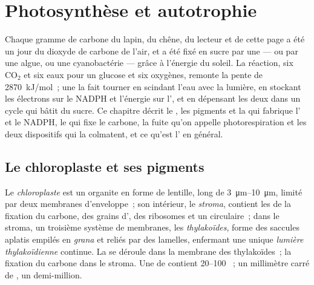 \chapter{Photosynthèse et autotrophie}\label{ch:b1:photosynthesis}

Chaque gramme de carbone du lapin, du chêne, du lecteur et de cette page
a été un jour du dioxyde de carbone de l'air, et a été fixé en sucre par
une  --- ou par une algue, ou une cyanobactérie --- grâce à
l'énergie du soleil. La réaction, six $\mathrm{CO_2}$ et six eaux pour
un glucose et six oxygènes, remonte la pente de \qty{2870}{kJ/mol}~; une
 la fait tourner en scindant l'eau avec la lumière, en stockant
les électrons sur le NADPH et l'énergie sur l', et en dépensant les
deux dans un cycle qui bâtit du sucre. Ce chapitre décrit le
, les pigments et la  qui fabrique l'
et le NADPH, le  qui fixe le carbone, la fuite qu'on
appelle photorespiration et les deux dispositifs qui la colmatent, et ce
qu'est l' en général.

\section{Le chloroplaste et ses pigments}

\begin{definition}[Chloroplaste]\label{def:b1:photosynthesis:chloroplast}
Le \emph{chloroplaste} est un organite en forme de
lentille, long de \qtyrange{3}{10}{\micro m}, limité par deux membranes
d'enveloppe~; son intérieur, le \emph{stroma}, contient
les  de la fixation du carbone, des grains d', des
ribosomes et un  circulaire~; dans le stroma, un troisième système
de membranes, les \emph{thylakoïdes}, forme des
saccules aplatis empilés en \emph{grana} et reliés par des lamelles,
enfermant une unique \emph{lumière thylakoïdienne} continue. La  se déroule dans la membrane des thylakoïdes~; la fixation
du carbone dans le stroma. Une  de  contient
\qtyrange{20}{100}{} ~; un millimètre carré de , un
demi-million.
\end{definition}

